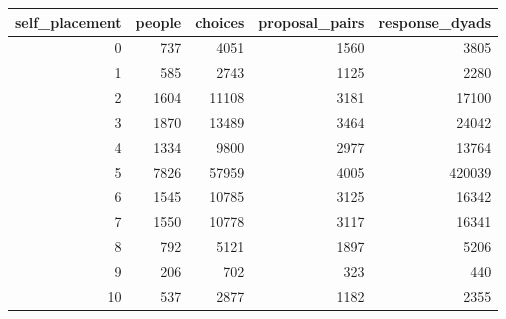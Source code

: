 \begin{tabular}{rrrrr}
\toprule
self\_placement & people & choices & proposal\_pairs & response\_dyads \\
\midrule
0 & 737 & 4051 & 1560 & 3805 \\
1 & 585 & 2743 & 1125 & 2280 \\
2 & 1604 & 11108 & 3181 & 17100 \\
3 & 1870 & 13489 & 3464 & 24042 \\
4 & 1334 & 9800 & 2977 & 13764 \\
5 & 7826 & 57959 & 4005 & 420039 \\
6 & 1545 & 10785 & 3125 & 16342 \\
7 & 1550 & 10778 & 3117 & 16341 \\
8 & 792 & 5121 & 1897 & 5206 \\
9 & 206 & 702 & 323 & 440 \\
10 & 537 & 2877 & 1182 & 2355 \\
\bottomrule
\end{tabular}
